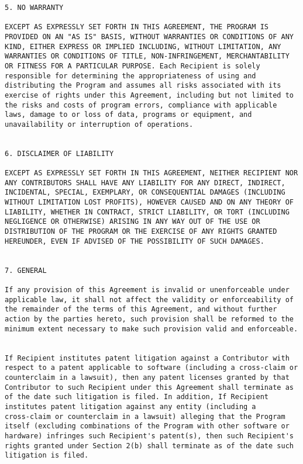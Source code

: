\begin{verbatim}
5. NO WARRANTY 

EXCEPT AS EXPRESSLY SET FORTH IN THIS AGREEMENT, THE PROGRAM IS
PROVIDED ON AN "AS IS" BASIS, WITHOUT WARRANTIES OR CONDITIONS OF ANY
KIND, EITHER EXPRESS OR IMPLIED INCLUDING, WITHOUT LIMITATION, ANY
WARRANTIES OR CONDITIONS OF TITLE, NON-INFRINGEMENT, MERCHANTABILITY
OR FITNESS FOR A PARTICULAR PURPOSE. Each Recipient is solely
responsible for determining the appropriateness of using and
distributing the Program and assumes all risks associated with its
exercise of rights under this Agreement, including but not limited to
the risks and costs of program errors, compliance with applicable
laws, damage to or loss of data, programs or equipment, and
unavailability or interruption of operations.  


6. DISCLAIMER OF LIABILITY 

EXCEPT AS EXPRESSLY SET FORTH IN THIS AGREEMENT, NEITHER RECIPIENT NOR
ANY CONTRIBUTORS SHALL HAVE ANY LIABILITY FOR ANY DIRECT, INDIRECT,
INCIDENTAL, SPECIAL, EXEMPLARY, OR CONSEQUENTIAL DAMAGES (INCLUDING
WITHOUT LIMITATION LOST PROFITS), HOWEVER CAUSED AND ON ANY THEORY OF
LIABILITY, WHETHER IN CONTRACT, STRICT LIABILITY, OR TORT (INCLUDING
NEGLIGENCE OR OTHERWISE) ARISING IN ANY WAY OUT OF THE USE OR
DISTRIBUTION OF THE PROGRAM OR THE EXERCISE OF ANY RIGHTS GRANTED
HEREUNDER, EVEN IF ADVISED OF THE POSSIBILITY OF SUCH DAMAGES.  


7. GENERAL 

If any provision of this Agreement is invalid or unenforceable under
applicable law, it shall not affect the validity or enforceability of
the remainder of the terms of this Agreement, and without further
action by the parties hereto, such provision shall be reformed to the
minimum extent necessary to make such provision valid and enforceable.  


If Recipient institutes patent litigation against a Contributor with
respect to a patent applicable to software (including a cross-claim or
counterclaim in a lawsuit), then any patent licenses granted by that
Contributor to such Recipient under this Agreement shall terminate as
of the date such litigation is filed. In addition, If Recipient
institutes patent litigation against any entity (including a
cross-claim or counterclaim in a lawsuit) alleging that the Program
itself (excluding combinations of the Program with other software or
hardware) infringes such Recipient's patent(s), then such Recipient's
rights granted under Section 2(b) shall terminate as of the date such
litigation is filed.  



\end{verbatim}
